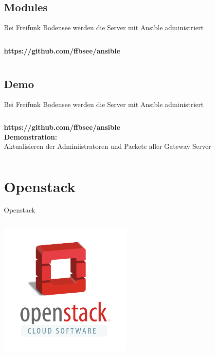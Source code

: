 \documentclass[aspectratio=169]{beamer}
\begin{document}
\subsection{Modules} 
\begin{frame}{Bei Freifunk Bodensee werden die Server mit Ansible administriert}
    \begin{columns}
        \begin{column}{1.0\textwidth}
            \centering
            \textbf{https://github.com/ffbsee/ansible} \\
            
        \end{column}
    \end{columns}
\end{frame}

\subsection{Demo} 
\begin{frame}{Bei Freifunk Bodensee werden die Server mit Ansible administriert}
    \begin{columns}
        \begin{column}{1.0\textwidth}
            \centering
            \textbf{https://github.com/ffbsee/ansible} \\
            \textbf{Demonstration:} \\
            Aktualisieren der Adminiistratoren und Packete aller Gateway Server \\
            
        \end{column}
    \end{columns}
\end{frame}





\section{Openstack} 
\begin{frame}{Openstack}
    \begin{columns}
        \begin{column}{1.0\textwidth}
            \centering
            \includegraphics[width=0.5\textwidth]{openstack.png}
        \end{column}
    \end{columns}
\end{frame}
\end{document}
